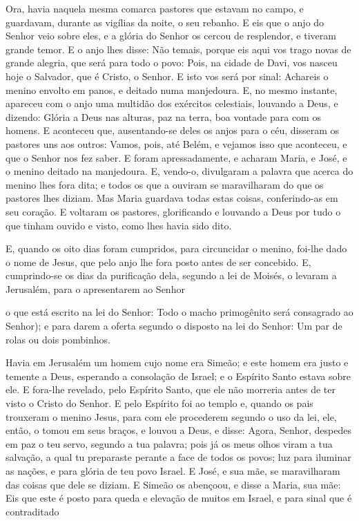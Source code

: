 Ora, havia naquela mesma comarca pastores que estavam no campo, e
guardavam, durante as vigílias da noite, o seu rebanho. E eis
que o anjo do Senhor veio sobre eles, e a glória do Senhor os cercou
de resplendor, e tiveram grande temor. E o anjo lhes disse:
Não temais, porque eis aqui vos trago novas de grande alegria, que
será para todo o povo: Pois, na cidade de Davi, vos nasceu
hoje o Salvador, que é Cristo, o Senhor. E isto vos será por
sinal: Achareis o menino envolto em panos, e deitado numa
manjedoura. E, no mesmo instante, apareceu com o anjo uma
multidão dos exércitos celestiais, louvando a Deus, e dizendo:
Glória a Deus nas alturas, paz na terra, boa vontade para com
os homens. E aconteceu que, ausentando-se deles os anjos para
o céu, disseram os pastores uns aos outros: Vamos, pois, até Belém,
e vejamos isso que aconteceu, e que o Senhor nos fez saber. E
foram apressadamente, e acharam Maria, e José, e o menino deitado na
manjedoura. E, vendo-o, divulgaram a palavra que acerca do
menino lhes fora dita; e todos os que a ouviram se
maravilharam do que os pastores lhes diziam. Mas Maria
guardava todas estas coisas, conferindo-as em seu coração. E
voltaram os pastores, glorificando e louvando a Deus por tudo o que
tinham ouvido e visto, como lhes havia sido dito.

E, quando os oito dias foram cumpridos, para circuncidar o
menino, foi-lhe dado o nome de Jesus, que pelo anjo lhe fora posto
antes de ser concebido. E, cumprindo-se os dias da
purificação dela, segundo a lei de Moisés, o levaram a Jerusalém,
para o apresentarem ao Senhor

o que está escrito na lei do Senhor: Todo o macho
primogênito será consagrado ao Senhor); e para darem a oferta
segundo o disposto na lei do Senhor: Um par de rolas ou dois
pombinhos.

Havia em Jerusalém um homem cujo nome era Simeão; e este homem
era justo e temente a Deus, esperando a consolação de Israel; e o
Espírito Santo estava sobre ele. E fora-lhe revelado, pelo
Espírito Santo, que ele não morreria antes de ter visto o Cristo do
Senhor. E pelo Espírito foi ao templo e, quando os pais
trouxeram o menino Jesus, para com ele procederem segundo o uso da
lei, ele, então, o tomou em seus braços, e louvou a Deus, e
disse: Agora, Senhor, despedes em paz o teu servo, segundo a
tua palavra; pois já os meus olhos viram a tua salvação,
a qual tu preparaste perante a face de todos os povos;
luz para iluminar as nações, e para glória de teu povo
Israel. E José, e sua mãe, se maravilharam das coisas que
dele se diziam. E Simeão os abençoou, e disse a Maria, sua
mãe: Eis que este é posto para queda e elevação de muitos em Israel,
e para sinal que é contraditado

